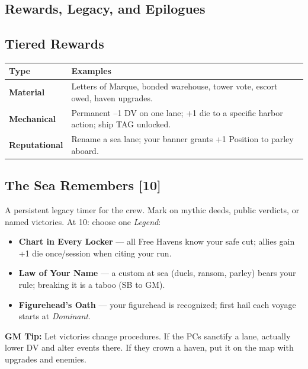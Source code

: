 \documentclass[11pt,oneside]{book}
\begin{document}
\begin{itemize}
\section{Rewards, Legacy, and Epilogues}

\subsection*{Tiered Rewards}
\begin{tabularx}{\linewidth}{@{}p{2.9cm} X@{}}
\toprule
\textbf{Type} & \textbf{Examples}\\
\midrule
\textbf{Material} & Letters of Marque, bonded warehouse, tower vote, escort owed, haven upgrades.\\
\textbf{Mechanical} & Permanent --1 DV on one lane; +1 die to a specific harbor action; ship TAG unlocked.\\
\textbf{Reputational} & Rename a sea lane; your banner grants +1 Position to parley aboard.\\
\bottomrule
\end{tabularx}

\subsection*{The Sea Remembers [10]}
A persistent legacy timer for the crew. Mark on mythic deeds, public verdicts, or named victories. At 10: choose one \emph{Legend}:
\begin{itemize}[leftmargin=*,itemsep=2pt]
  \item \textbf{Chart in Every Locker} --- all Free Havens know your safe cut; allies gain +1 die once/session when citing your run.
  \item \textbf{Law of Your Name} --- a custom at sea (duels, ransom, parley) bears your rule; breaking it is a taboo (SB to GM).
  \item \textbf{Figurehead's Oath} --- your figurehead is recognized; first hail each voyage starts at \emph{Dominant}.
\end{itemize}

\begin{tcolorbox}[breakable]
\textbf{GM Tip:} Let victories change procedures. If the PCs sanctify a lane, actually lower DV and alter events there. If they crown a haven, put it on the map with upgrades and enemies.
\end{tcolorbox}


\end{itemize}
\end{document}

